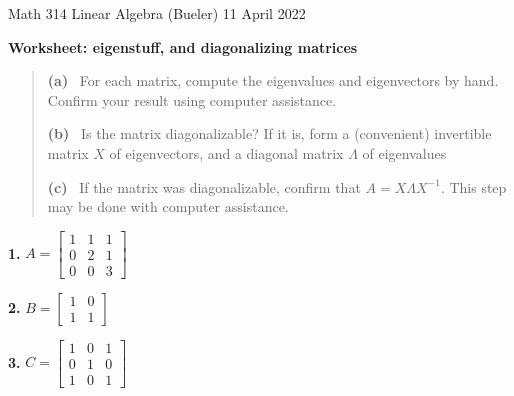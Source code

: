 \documentclass[12pt]{amsart}
\newcommand{\prob}[1]{\bigskip\noindent\textbf{#1.}\quad }
\newcommand{\ds}{\displaystyle}
\begin{document}
\scriptsize \noindent Math 314 Linear Algebra (Bueler) \hfill 11 April 2022 
\normalsize\medskip

\Large\centerline{\textbf{Worksheet: eigenstuff, and diagonalizing matrices}}
\medskip
\normalsize

\thispagestyle{empty}
\begin{quote}
\textbf{(a)} \, For each matrix, compute the eigenvalues and eigenvectors by hand.  Confirm your result using computer assistance.

\medskip
\noindent \textbf{(b)} \, Is the matrix diagonalizable?  If it is, form a (convenient) invertible matrix $X$ of eigenvectors, and a diagonal matrix $\Lambda$ of eigenvalues

\medskip
\noindent \textbf{(c)} \, If the matrix was diagonalizable, confirm that $A = X \Lambda X^{-1}$.  This step may be done with computer assistance.
\end{quote}

\medskip

\prob{1} $\ds A = \begin{bmatrix} 1 & 1 & 1 \\ 0 & 2 & 1 \\ 0 & 0 & 3 \end{bmatrix}$
\vfill

\clearpage \newpage
\prob{2} $\ds B = \begin{bmatrix} 1 & 0 \\ 1 & 1 \end{bmatrix}$
\vspace{2.5in}

\prob{3} $\ds C = \begin{bmatrix} 1 & 0 & 1 \\ 0 & 1 & 0 \\ 1 & 0 & 1 \end{bmatrix}$
\vfill
\end{document}
